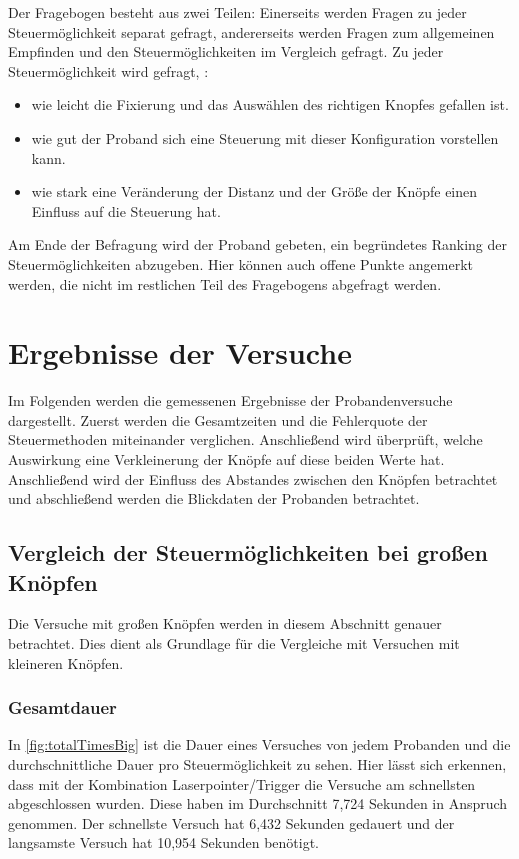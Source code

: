 Der Fragebogen besteht aus zwei Teilen: Einerseits werden Fragen zu jeder Steuermöglichkeit separat gefragt, andererseits werden Fragen zum allgemeinen Empfinden und den Steuermöglichkeiten im Vergleich gefragt.
Zu jeder Steuermöglichkeit wird gefragt, :
\begin{itemize}
	\item wie leicht die Fixierung und das Auswählen des richtigen Knopfes gefallen ist.
	\item wie gut der Proband sich eine Steuerung mit dieser Konfiguration vorstellen kann.
	\item wie stark eine Veränderung der Distanz und der Größe der Knöpfe einen Einfluss auf die Steuerung hat.
\end{itemize}
Am Ende der Befragung wird der Proband gebeten, ein begründetes Ranking der Steuermöglichkeiten abzugeben. Hier können auch offene Punkte angemerkt werden, die nicht im restlichen Teil des Fragebogens abgefragt werden.


\section{Ergebnisse der Versuche}
\label{section:results}
Im Folgenden werden die gemessenen Ergebnisse der Probandenversuche dargestellt. Zuerst werden die Gesamtzeiten und die Fehlerquote der Steuermethoden miteinander verglichen. Anschließend wird überprüft, welche Auswirkung eine Verkleinerung der Knöpfe auf diese beiden Werte hat. Anschließend wird der Einfluss des Abstandes zwischen den Knöpfen betrachtet und abschließend werden die Blickdaten der Probanden betrachtet.
\subsection{Vergleich der Steuermöglichkeiten bei großen Knöpfen}
\label{section:comparison}
Die Versuche mit großen Knöpfen werden in diesem Abschnitt genauer betrachtet. Dies dient als Grundlage für die Vergleiche mit Versuchen mit kleineren Knöpfen.

\subsubsection{Gesamtdauer}
In \autoref{fig:totalTimesBig} ist die Dauer eines Versuches von jedem Probanden und die durchschnittliche Dauer pro Steuermöglichkeit zu sehen. Hier lässt sich erkennen, dass mit der Kombination Laserpointer/Trigger die Versuche am schnellsten abgeschlossen wurden. Diese haben im Durchschnitt 7,724 Sekunden in Anspruch genommen. Der schnellste Versuch hat 6,432 Sekunden gedauert und der langsamste Versuch hat 10,954 Sekunden benötigt.

